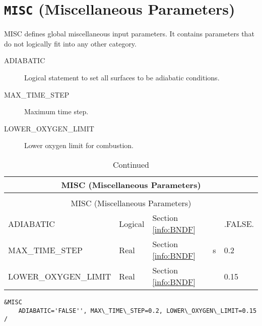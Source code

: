 \vspace{\baselineskip}


\section{\texorpdfstring{{\tt MISC}}{MISC} (Miscellaneous Parameters)}

MISC defines global miscellaneous input parameters. It contains parameters that do not logically fit into any other category.

\begin{adjustwidth}{1cm}{0cm}
\begin{description}
  \item[ADIABATIC] Logical statement to set all surfaces to be adiabatic conditions.
  \item[MAX\_TIME\_STEP] Maximum time step.
  \item[LOWER\_OXYGEN\_LIMIT] Lower oxygen limit for combustion.
\end{description}
\end{adjustwidth}

\vspace{\baselineskip}

\begin{longtable}{@{\extracolsep{\fill}}|l|l|l|l|l|}
\caption[Boundary file parameters ({\ct MISC} namelist group)]{For more information see Section~\ref{info:BNDF}.}
\label{tbl:MISC} \\
\hline
\multicolumn{5}{|c|}{{\ct MISC} (Miscellaneous Parameters)} \\
\hline \hline
\endfirsthead
\caption[]{Continued} \\
\hline
\multicolumn{5}{|c|}{{\ct MISC} (Miscellaneous Parameters)} \\
\hline \hline
\endhead
{\ct ADIABATIC}            & Logical     & Section \ref{info:BNDF}                 &           & {\ct .FALSE.}   \\ \hline
{\ct MAX\_TIME\_STEP}      & Real        & Section \ref{info:BNDF}                 & s         & 0.2            \\ \hline
{\ct LOWER\_OXYGEN\_LIMIT} & Real        & Section \ref{info:BNDF}                 &           & 0.15            \\ \hline
\end{longtable}

\begin{lstlisting}
&MISC 
	ADIABATIC='FALSE'', MAX\_TIME\_STEP=0.2, LOWER\_OXYGEN\_LIMIT=0.15 /
\end{lstlisting}

